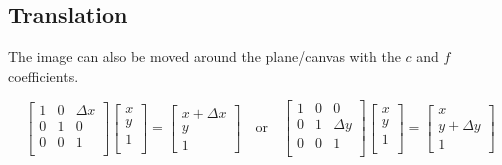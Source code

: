 \documentclass{article}
\begin{document}
\begin{figure}[!htbp]
    \centering
\end{figure}

\clearpage
\subsection{Translation} 

The image can also be moved around the plane/canvas with the $ c $ and $ f $
coefficients.

\[%
    \begin{bmatrix} 
        1 & 0 & \Delta {x} \\
		0 & 1 & 0 \\
		0 & 0 & 1 \\		
    \end{bmatrix}
    \begin{bmatrix}
        x \\
        y \\
		1 \\		
    \end{bmatrix}
    =
    \begin{bmatrix} x + \Delta {x} \\  y \\ 1 \end{bmatrix}
    \quad
    \text{or}
    \quad
    \begin{bmatrix} 
        1 & 0 & 0 \\
		0 & 1 & \Delta {y} \\
		0 & 0 & 1 \\		
    \end{bmatrix}
    \begin{bmatrix}
        x \\
        y \\
		1 \\		
    \end{bmatrix}
    =
    \begin{bmatrix} x \\ y + \Delta {y} \\ 1 \end{bmatrix}
\]%

\begin{figure}[!htbp]
    \centering
\end{figure}
\end{document}
